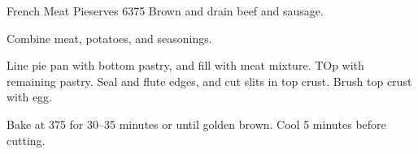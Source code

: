 \begin{recipe}{French Meat Pie}{serves 6}{375\0}
    Brown and drain beef and sausage.

    Combine meat, potatoes, and seasonings.

    Line pie pan with bottom pastry, and fill with meat mixture. TOp with remaining pastry. Seal and flute edges, and cut slits in top crust. Brush top crust with egg.

    \newstep
    Bake at 375\0 for 30--35 minutes or until golden brown. Cool 5 minutes before cutting.
\end{recipe}
